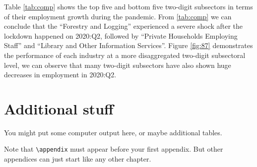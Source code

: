 \documentclass{monashthesis}
\begin{document}
Table \ref{tab:comp} shows the top five and bottom five two-digit subsectors in terms of their employment growth during the pandemic. From \ref{tab:comp} we can conclude that the ``Forestry and Logging'' experienced a severe shock after the lockdown happened on 2020:Q2, followed by ``Private Households Employing Staff'' and ``Library and Other Information Services''. Figure \ref{fig:87} demonstrates the performance of each industry at a more disaggregated two-digit subsectoral level, we can observe that many two-digit subsectors have also shown huge decreases in employment in 2020:Q2.

\appendix

\hypertarget{additional-stuff}{%
\chapter{Additional stuff}\label{additional-stuff}}

You might put some computer output here, or maybe additional tables.

Note that \texttt{\textbackslash{}appendix} must appear before your first appendix. But other appendices can just start like any other chapter.

\printbibliography[heading=bibintoc]
\end{document}
